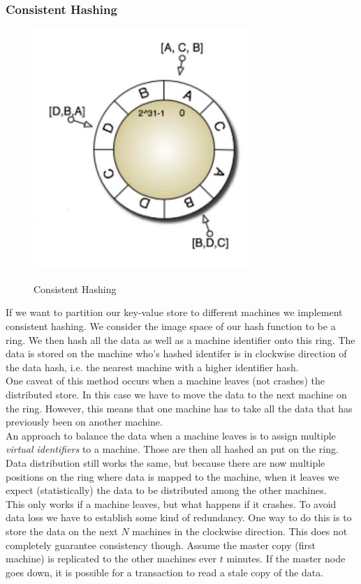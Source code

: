\subsubsection{Consistent Hashing}
\begin{figure}
\centering
\includegraphics[width=.4\textwidth]{images/consistent_hashing.PNG}
\label{consistent_hashing}
\caption{Consistent Hashing}
\end{figure}
If we want to partition our key-value store to different machines we implement consistent hashing. We consider the image space of our hash function to be a ring. We then hash all the data as well as a machine identifier onto this ring. The data is stored on the machine who's hashed identifer is in clockwise direction of the data hash, i.e. the nearest machine with a higher identifier hash.\\
One caveat of this method occurs when a machine leaves (not crashes) the distributed store. In this case we have to move the data to the next machine on the ring. However, this means that one machine has to take all the data that has previously been on another machine.\\
An approach to balance the data when a machine leaves is to assign multiple \textit{virtual identifiers} to a machine. Those are then all hashed an put on the ring. Data distribution still works the same, but because there are now multiple positions on the ring where data is mapped to the machine, when it leaves we expect (statistically) the data to be distributed among the other machines.
\vspace{.3cm}\\
This only works if a machine leaves, but what happens if it crashes. To avoid data loss we have to establish some kind of redundancy. One way to do this is to store the data on the next $N$ machines in the clockwise direction. This does not completely guarantee consistency though. Assume the master copy (first machine) is replicated to the other machines ever $t$ minutes. If the master node goes down, it is possible for a transaction to read a stale copy of the data.\\
